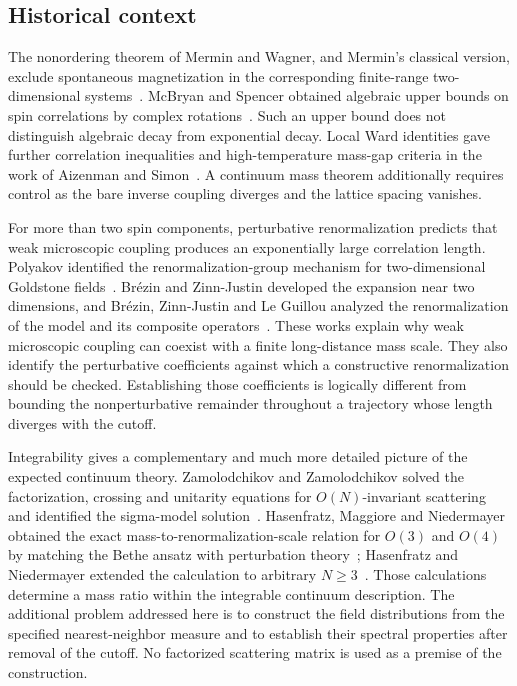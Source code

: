 \subsection{Historical context}
\label{subsec:history}

The nonordering theorem of Mermin and Wagner, and Mermin's classical
version, exclude spontaneous magnetization in the corresponding
finite-range two-dimensional systems~\cite{MW,Mermin1967}.
McBryan and Spencer obtained algebraic upper bounds on spin correlations
by complex rotations~\cite{McBryanSpencer}.  Such an upper bound does not
distinguish algebraic decay from exponential decay.  Local Ward
identities gave further correlation inequalities and high-temperature
mass-gap criteria in the work of Aizenman and
Simon~\cite{AizenmanSimonWard}.  A continuum mass theorem additionally
requires control as the bare inverse coupling diverges and the lattice
spacing vanishes.

For more than two spin components, perturbative renormalization
predicts that weak microscopic coupling produces an exponentially
large correlation length.  Polyakov identified the renormalization-group
mechanism for two-dimensional Goldstone fields~\cite{Polyakov}.
Br\'ezin and Zinn-Justin developed the expansion near two dimensions,
and Br\'ezin, Zinn-Justin and Le Guillou analyzed the renormalization of
the model and its composite operators~\cite{BrezinZinnJustin,BrezinZinnJustinLeGuillou}.
These works explain why weak microscopic coupling can coexist with a
finite long-distance mass scale.  They also identify the perturbative
coefficients against which a constructive renormalization should be
checked.  Establishing those coefficients is logically different from
bounding the nonperturbative remainder throughout a trajectory whose
length diverges with the cutoff.

Integrability gives a complementary and much more detailed picture of
the expected continuum theory.  Zamolodchikov and Zamolodchikov solved
the factorization, crossing and unitarity equations for
$O(N)$-invariant scattering and identified the sigma-model
solution~\cite{ZamolodchikovZamolodchikov}.  Hasenfratz, Maggiore and
Niedermayer obtained the exact mass-to-renormalization-scale relation
for $O(3)$ and $O(4)$ by matching the Bethe ansatz with perturbation
theory~\cite{HasenfratzMaggioreNiedermayer}; Hasenfratz and Niedermayer
extended the calculation to arbitrary $N\ge3$~\cite{HasenfratzNiedermayer}.
Those calculations determine a mass ratio within the integrable
continuum description.  The additional problem addressed here is to
construct the field distributions from the specified nearest-neighbor
measure and to establish their spectral properties after removal of
the cutoff.  No factorized scattering matrix is used as a premise of
the construction.

